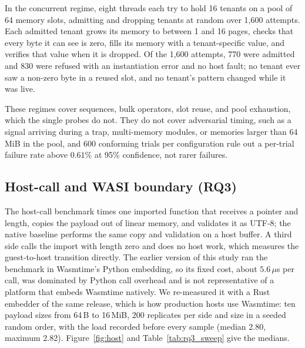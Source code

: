 \documentclass{ws-jcsc}
\begin{document}
In the concurrent regime, eight threads each try to hold 16 tenants on a pool of 64 memory slots, admitting and dropping tenants at random over 1{,}600 attempts. Each admitted tenant grows its memory to between 1 and 16 pages, checks that every byte it can see is zero, fills its memory with a tenant-specific value, and verifies that value when it is dropped. Of the 1{,}600 attempts, 770 were admitted and 830 were refused with an instantiation error and no host fault; no tenant ever saw a non-zero byte in a reused slot, and no tenant's pattern changed while it was live.

These regimes cover sequences, bulk operators, slot reuse, and pool exhaustion, which the single probes do not. They do not cover adversarial timing, such as a signal arriving during a trap, multi-memory modules, or memories larger than 64\,MiB in the pool, and 600 conforming trials per configuration rule out a per-trial failure rate above $0.61\%$ at 95\% confidence, not rarer failures.





\subsection{Host-call and WASI boundary (RQ3)}
\label{sec:rq3}
The host-call benchmark times one imported function that receives a pointer and length, copies the payload out of linear memory, and validates it as UTF-8; the native baseline performs the same copy and validation on a host buffer. A third side calls the import with length zero and does no host work, which measures the guest-to-host transition directly. The earlier version of this study ran the benchmark in Wasmtime's Python embedding, so its fixed cost, about $5.6\,\mu$s per call, was dominated by Python call overhead and is not representative of a platform that embeds Wasmtime natively. We re-measured it with a Rust embedder of the same release, which is how production hosts use Wasmtime: ten payload sizes from 64\,B to 16\,MiB, 200 replicates per side and size in a seeded random order, with the load recorded before every sample (median 2.80, maximum 2.82). Figure~\ref{fig:host} and Table~\ref{tab:rq3_sweep} give the medians.
\end{document}
